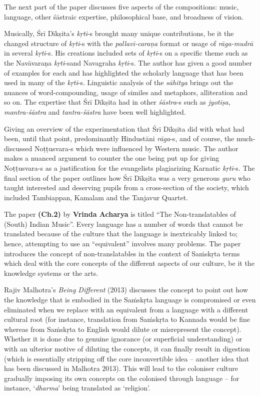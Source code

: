 The next part of the paper discusses five aspects of the compositions: music, language, other śāstraic expertise, philosophical base, and broadness of vision.

Musically, Śrī Dīkṣita’s \textit{kṛti}-s brought many unique contributions, be it the changed structure of \textit{kṛti}-s with the \textit{pallavi-caraṇa} format or usage of \textit{rāga-mudrā} in several \textit{kṛti}-s. His creations included sets of \textit{kṛti}-s on a specific theme such as the Navāvaraṇa \textit{kṛti}-s\break and Navagraha \textit{kṛti}-s. The author has given a good number of examples for each and has highlighted the scholarly language that has been used in many of the \textit{kṛti}-s. Linguistic analysis of the \textit{sāhitya} brings out the nuances of word-compounding, usage of similes and metaphors, alliteration and so on. The expertise that Śrī Dīkṣita had in other \textit{śāstra}-s such as \textit{jyotiṣa, mantra-śāstra} and \textit{tantra-śāstra} have been well highlighted.

Giving an overview of the experimentation that Śrī Dīkṣita did with what had been, until that point, predominantly Hindustāni \textit{rāga}-s, and of course, the much-discussed Noṭṭusvara-s which were influenced by Western music. The author makes a nuanced argument to counter the one being put up for giving Noṭṭusvara-s as a justification for the evangelists plagiarizing Karnatic \textit{kṛti}-s. The final section of the paper outlines how Śrī Dīkṣita was a very generous \textit{guru} who taught interested and deserving pupils from a cross-section of the society, which included Tambiappan, Kamalam and the Tanjavur Quartet.

The paper \textbf{(Ch.2)} by \textbf{Vrinda Acharya} is titled “The Non-translatables of (South) Indian Music”. Every language has a number of words that cannot be translated because of the culture that the language is inextricably linked to; hence, attempting to use an “equivalent” involves many problems. The paper introduces the concept of non-translatables in the context of Saṁskṛta terms which deal with the core concepts of the different aspects of our culture, be it the knowledge systems or the arts.

Rajiv Malhotra’s \textit{Being Different} (2013) discusses the concept to point out how the knowledge that is embodied in the Saṁskṛta language is compromised or even eliminated when we replace with an equivalent from a language with a different cultural root (for instance, translation from Saṁskṛta to Kannada would be fine whereas from Saṁskṛta to English would dilute or misrepresent the concept). Whether it is done due to genuine ignorance (or superficial understanding) or with an ulterior motive of diluting the concepts, it can finally result in digestion (which is essentially stripping off the core inconvertible idea – another idea that has been discussed in Malhotra 2013). This will lead to the coloniser culture gradually imposing its own concepts on the colonised through language – for instance, ‘\textit{dharma}’ being translated as ‘religion’.

